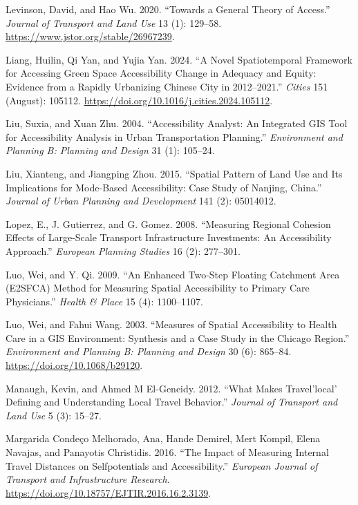 \documentclass[
]{article}
\newlength{\cslhangindent}
\newenvironment{CSLReferences}[2] %
 {\begin{list}{}{%
  \setlength{\itemindent}{0pt}
  \setlength{\leftmargin}{0pt}
  \setlength{\parsep}{0pt}
  \ifodd #1
   \setlength{\leftmargin}{\cslhangindent}
   \setlength{\itemindent}{-1\cslhangindent}
  \fi
  \setlength{\itemsep}{#2\baselineskip}}}
 {\end{list}}
\begin{document}
\begin{CSLReferences}{1}{0}
Levinson, David, and Hao Wu. 2020. {``Towards a General Theory of
Access.''} \emph{Journal of Transport and Land Use} 13 (1): 129--58.
\url{https://www.jstor.org/stable/26967239}.

Liang, Huilin, Qi Yan, and Yujia Yan. 2024. {``A Novel Spatiotemporal
Framework for Accessing Green Space Accessibility Change in Adequacy and
Equity: {Evidence} from a Rapidly Urbanizing {Chinese} {City} in
2012--2021.''} \emph{Cities} 151 (August): 105112.
\url{https://doi.org/10.1016/j.cities.2024.105112}.

Liu, Suxia, and Xuan Zhu. 2004. {``Accessibility Analyst: An Integrated
GIS Tool for Accessibility Analysis in Urban Transportation Planning.''}
\emph{Environment and Planning B: Planning and Design} 31 (1): 105--24.

Liu, Xianteng, and Jiangping Zhou. 2015. {``Spatial Pattern of Land Use
and Its Implications for Mode-Based Accessibility: Case Study of
Nanjing, China.''} \emph{Journal of Urban Planning and Development} 141
(2): 05014012.

Lopez, E., J. Gutierrez, and G. Gomez. 2008. {``Measuring Regional
Cohesion Effects of Large-Scale Transport Infrastructure Investments:
{An} Accessibility Approach.''} \emph{European Planning Studies} 16 (2):
277--301.

Luo, Wei, and Y. Qi. 2009. {``An Enhanced Two-Step Floating Catchment
Area ({E2SFCA}) Method for Measuring Spatial Accessibility to Primary
Care Physicians.''} \emph{Health \& Place} 15 (4): 1100--1107.

Luo, Wei, and Fahui Wang. 2003. {``Measures of Spatial Accessibility to
Health Care in a GIS Environment: Synthesis and a Case Study in the
Chicago Region.''} \emph{Environment and Planning B: Planning and
Design} 30 (6): 865--84. \url{https://doi.org/10.1068/b29120}.

Manaugh, Kevin, and Ahmed M El-Geneidy. 2012. {``What Makes
Travel'local' Defining and Understanding Local Travel Behavior.''}
\emph{Journal of Transport and Land Use} 5 (3): 15--27.

Margarida Condeço Melhorado, Ana, Hande Demirel, Mert Kompil, Elena
Navajas, and Panayotis Christidis. 2016. {``The Impact of Measuring
Internal Travel Distances on Selfpotentials and Accessibility.''}
\emph{European Journal of Transport and Infrastructure Research}.
\url{https://doi.org/10.18757/EJTIR.2016.16.2.3139}.


\end{CSLReferences}
\end{document}
